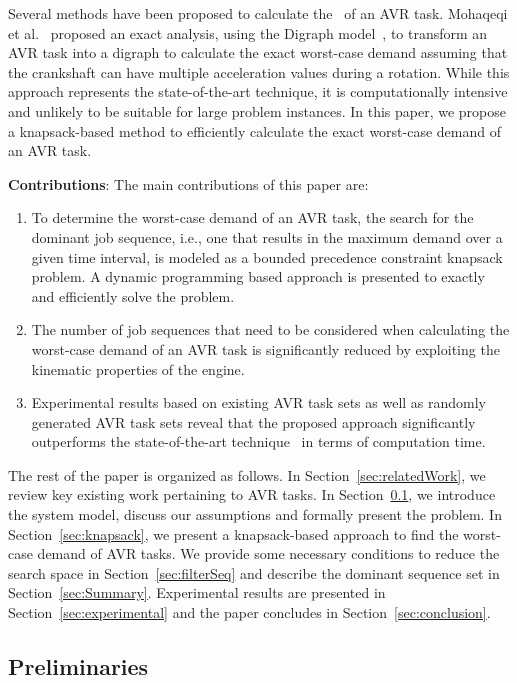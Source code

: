 Several methods have been proposed to calculate the \dbf~of an AVR task.
Mohaqeqi et al.~\cite{mohaqeqi_refinement_2017} proposed an exact analysis, using the Digraph model~\cite{stigge_digraph_2011}, to transform an AVR task into a digraph to calculate the exact worst-case demand assuming that the crankshaft can have multiple acceleration values during a rotation.
While this approach represents the state-of-the-art technique, it is computationally intensive and unlikely to be suitable for large problem instances.
In this paper, we propose a knapsack-based method to efficiently calculate the exact worst-case demand of an AVR task.

\noindent \textbf{Contributions}: The main contributions of this paper are:
\begin{enumerate}
\item To determine the worst-case demand of an AVR task, the search for the dominant job sequence, i.e., one that results in the maximum demand over a given time interval, is modeled as a bounded precedence constraint knapsack problem.
A dynamic programming based approach is presented to exactly and efficiently solve the problem.
\item  The number of job sequences that need to be considered when calculating the worst-case demand of an AVR task is significantly reduced by exploiting the kinematic properties of the engine.
\item Experimental results based on existing AVR task sets as well as randomly generated AVR task sets reveal that the proposed approach significantly outperforms the state-of-the-art technique~\cite{mohaqeqi_refinement_2017} in terms of computation time.
\end{enumerate}

The rest of the paper is organized as follows.
In Section~\ref{sec:relatedWork}, we review key existing work pertaining to AVR tasks.
In Section~\ref{sec:prelims}, we introduce the system model, discuss our assumptions and formally present the problem.
In Section~\ref{sec:knapsack}, we present a knapsack-based approach to find the worst-case demand of AVR tasks. %
We provide some necessary conditions to reduce the search space in Section~\ref{sec:filterSeq} and describe the dominant sequence set in Section~\ref{sec:Summary}.
Experimental results are presented in Section~\ref{sec:experimental} and the paper concludes in Section~\ref{sec:conclusion}.

\subsection{Preliminaries}
\label{sec:prelims}


